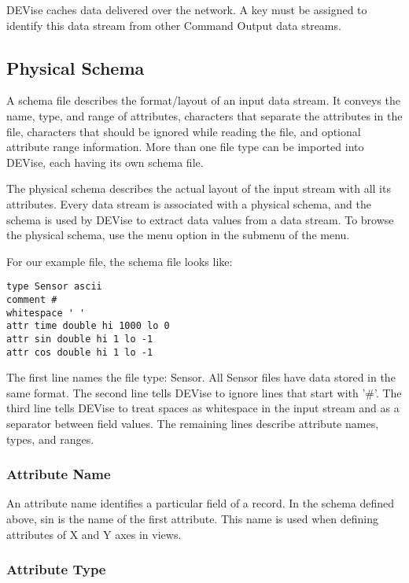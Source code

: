 DEVise caches data delivered over the network. A key must be assigned to
identify this data stream from other Command Output data streams.


\subsection{Physical Schema}

A schema file describes the format/layout of an input data stream. It conveys
the name, type, and range of attributes, characters that separate the attributes
in the file, characters that should be ignored while reading the file, and
optional attribute range information. More than one file type can be imported
into DEVise, each having its own schema file.

The physical schema describes the actual layout of the input stream with all its
attributes. Every data stream is associated with a physical schema, and the
schema is used by DEVise to extract data values from a data stream. To browse
the physical schema, use the  menu option in the 
submenu of the  menu.

For our example file, the schema file looks like:

\begin{verbatim}
type Sensor ascii
comment #
whitespace ' '
attr time double hi 1000 lo 0
attr sin double hi 1 lo -1
attr cos double hi 1 lo -1
\end{verbatim}

The first line names the file type: Sensor. All Sensor files have data stored in
the same format. The second line tells DEVise to ignore lines that start with
'\#'. The third line tells DEVise to treat spaces as whitespace in the input
stream and as a separator between field values. The remaining lines describe
attribute names, types, and ranges.

\subsubsection{Attribute Name}

An attribute name identifies a particular field of a record. In the schema
defined above, sin is the name of the first attribute. This name is used when
defining attributes of X and Y axes in views.

\subsubsection{Attribute Type}

